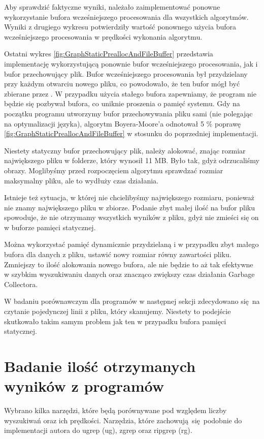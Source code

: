 Aby sprawdzić faktyczne wyniki, należało zaimplementować ponowne wykorzystanie
bufora wcześniejszego procesowania dla wszystkich algorytmów. Wyniki z drugiego wykresu 
potwierdziły wartość ponownego użycia bufora wcześniejszego procesowania w prędkości wykonania
algorytmu.

Ostatni wykres \ref{fig:GraphStaticPreallocAndFileBuffer} przedstawia implementację
wykorzystującą ponownie bufor wcześniejszego procesowania, jak i bufor przechowujący plik.
Bufor wcześniejszego procesowania był przydzielany przy każdym otwarciu nowego pliku,
co powodowało, że ten bufor mógł być zbierane przez .
W przypadku użycia stałego bufora zapewniamy, że program nie będzie się pozbywał
bufora, co uniknie proszenia o pamięć systemu. Gdy na początku programu utworzymy
bufor przechowywania pliku sami (nie polegając na optymalizacji języka), algorytm Boyera-Moore'a
odnotował 5 \% poprawę \ref{fig:GraphStaticPreallocAndFileBuffer} w stosunku do poprzedniej implementacji.

Niestety statyczny bufor przechowujący plik, należy alokować, znając rozmiar 
największego pliku w folderze, który wynosił 11 MB. Było tak, gdyż odrzucaliśmy
obrazy. Moglibyśmy przed rozpoczęciem algorytmu sprawdzać rozmiar maksymalny 
pliku, ale to wydłuży czas działania.

Istnieje też sytuacja, w której nie chcielibyśmy największego rozmiaru, ponieważ nie
znamy największego pliku w zbiorze. Podanie zbyt małej ilość na bufor pliku spowoduje,
że nie otrzymamy wszystkich wyników z pliku, gdyż nie zmieści się on w buforze pamięci statycznej.

Można wykorzystać pamięć dynamicznie przydzielaną i w przypadku zbyt małego 
bufora dla danych z pliku, ustawić nowy rozmiar równy zawartości pliku.
Zmniejszy to ilość alokowania nowego bufora, ale nie będzie to aż tak efektywne
w szybkim wyszukiwaniu danych oraz znacząco zwiększy czas działania Garbage Collectora.

W badaniu porównawczym dla programów w następnej sekcji zdecydowano się na
czytanie pojedynczej linii z pliku, który skanujemy. Niestety to podejście
skutkowało takim samym problem jak ten w przypadku bufora pamięci statycznej.

\section{Badanie ilość otrzymanych wyników z programów}

Wybrano kilka narzędzi, które będą porównywane pod względem liczby wyszukiwań
oraz ich prędkości. Narzędzia, które zachowują się podobnie do implementacji
autora do ugrep (ug), zgrep oraz ripgrep (rg). 

